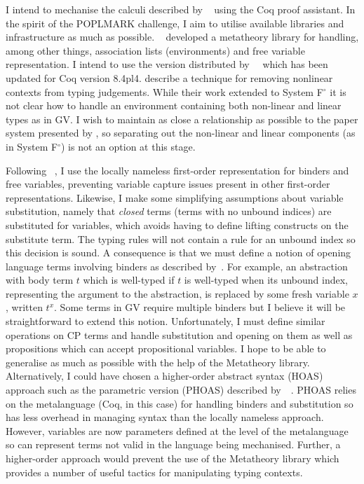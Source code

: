 \documentclass{mprop}
\newcommand{\fpop}{System F${}^\circ$\xspace}
\newcommand{\1}{\textbf{1}\xspace}
\begin{document}
I intend to mechanise the calculi described by \citeauthor{Wadler:2012}~\cite{Wadler:2012} using the Coq proof assistant. In the spirit of the POPLMARK challenge, I aim to utilise available libraries and infrastructure as much as possible. \citeauthor{Aydemir:2008:EFM}~\cite{Aydemir:2008:EFM} developed a metatheory library for handling, among other things, association lists (environments) and free variable representation. I intend to use the version distributed by~\citeauthor{Park:2014:MMW}~\cite{Park:2014:MMW} which has been updated for Coq version 8.4pl4. \citeauthor{Park:2014:MMW} describe a technique for removing nonlinear contexts from typing judgements. While their work extended to \fpop it is not clear how to handle an environment containing both non-linear and linear types as in GV. I wish to maintain as close a relationship as possible to the paper system presented by \citeauthor{Wadler:2012}, so separating out the non-linear and linear components (as in \fpop) is not an option at this stage.

Following \citeauthor{Aydemir:2008:EFM}~\cite{Aydemir:2008:EFM}, I use the locally nameless first-order representation for binders and free variables, preventing variable capture issues present in other first-order representations. Likewise, I make some simplifying assumptions about variable substitution, namely that \textit{closed} terms (terms with no unbound indices) are substituted for variables, which avoids having to define lifting constructs on the substitute term. The typing rules will not contain a rule for an unbound index so this decision is sound. A consequence is that we must define a notion of opening language terms involving binders as described by~\citeauthor{Aydemir:2008:EFM}. For example, an abstraction with body term $t$ which is well-typed if $t$ is well-typed when its unbound index, representing the argument to the abstraction, is replaced by some fresh variable $x$, written $t^x$. Some terms in GV require multiple binders but I believe it will be straightforward to extend this notion. Unfortunately, I must define similar operations on CP terms and handle substitution and opening on them as well as propositions which can accept propositional variables. I hope to be able to generalise as much as possible with the help of the Metatheory library. Alternatively, I could have chosen a higher-order abstract syntax (HOAS) approach such as the parametric version (PHOAS) described by~\citeauthor{Chlipala:2008:PHOAS}~\cite{Chlipala:2008:PHOAS}. PHOAS relies on the metalanguage (Coq, in this case) for handling binders and substitution so has less overhead in managing syntax than the locally nameless approach. However, variables are now parameters defined at the level of the metalanguage so can represent terms not valid in the language being mechanised. Further, a higher-order approach would prevent the use of the Metatheory library which provides a number of useful tactics for manipulating typing contexts.
\end{document}
